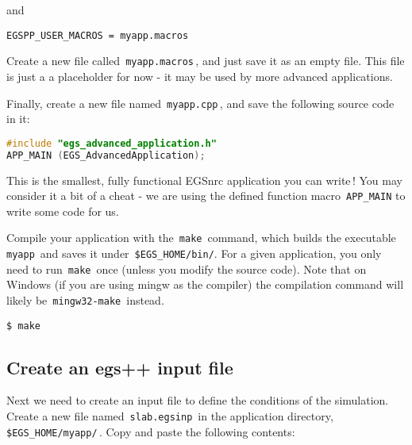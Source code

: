 \documentclass[12pt,twoside]{article}
\begin{document}
and

\begin{lstlisting}
EGSPP_USER_MACROS = myapp.macros
\end{lstlisting}

Create a new file called \,\Verb|myapp.macros|\,, and just save it as an empty
file. This file is just a a placeholder for now - it may be used by
more advanced applications.

Finally, create a new file named \,\Verb|myapp.cpp|\,, and save the following
source code in it:

\begin{lstlisting}[language=c++,backgroundcolor=\color{white}]
#include "egs_advanced_application.h"
APP_MAIN (EGS_AdvancedApplication);
\end{lstlisting}

This is the smallest, fully functional EGSnrc application you can write\,!
You may consider it a bit of a cheat - we are using the defined function macro
\,\Verb|APP_MAIN| to write some code for us.

Compile your application with the \,\Verb|make|\, command, which builds the
executable \,\Verb|myapp|\, and saves it under \,\Verb|$EGS_HOME/bin/|. For a
given application, you only need to run \,\Verb|make|\, once
(unless you modify the source code). Note that on Windows (if you are using 
mingw as the compiler) the compilation command will likely be 
\,\Verb|mingw32-make|\, instead.
\begin{lstlisting}
$ make
\end{lstlisting}

\subsection{Create an egs++ input file}

Next we need to create an input file to define the conditions of the simulation.
Create a new file named \,\Verb|slab.egsinp|\, in the application directory,
\,\Verb|$EGS_HOME/myapp/|\,. Copy and paste the following contents:
\end{document}
